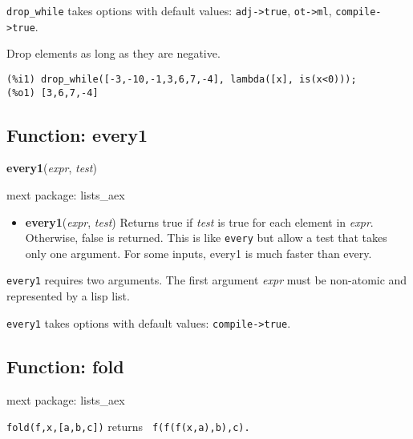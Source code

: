 \documentclass[]{article}
\begin{document}
{\tt drop\_while} takes options with default values: {\tt adj->true}, {\tt ot->ml}, {\tt compile->true}.
\vspace{5 pt}


   Drop elements as long as they are negative. 

\begin{Verbatim}[frame=single]
(%i1) drop_while([-3,-10,-1,3,6,7,-4], lambda([x], is(x<0)));
(%o1) [3,6,7,-4]
\end{Verbatim}


\subsection{Function: every1\label{sec:every1}}
\hypertarget{every1}{}
{\bf every1}({\it expr}, {\it test})


\noindent mext package: lists\_aex



\vspace{5 pt}
\begin{itemize}
\item[] {\bf every1}({\it expr}, {\it test})
  Returns true if {\it test} is true for each element in {\it expr}. Otherwise, false is returned. This is like \verb#every# but allow a test that takes only one argument. For some inputs, every1 is much faster than every. 

\end{itemize}
   {\tt every1} requires two arguments.
    The first argument {\it expr} must be non-atomic and represented by a lisp list.


\vspace{5 pt}

{\tt every1} takes options with default values: {\tt compile->true}.
\vspace{5 pt}


\subsection{Function: fold\label{sec:fold}}
\hypertarget{fold}{}


\noindent mext package: lists\_aex



\vspace{5 pt}
\verb#fold(f,x,[a,b,c])# returns \verb# f(f(f(x,a),b),c).# 
\end{document}
